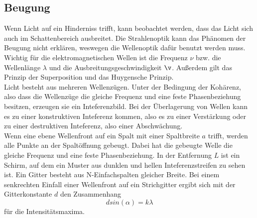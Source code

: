 \subsection{Beugung}
\label{subsec:Beugung}
Wenn Licht auf ein Hinderniss trifft, kann beobachtet werden, dass das Licht sich auch im Schattenbereich ausbreitet.
Die Strahlenoptik kann das Phänomen der Beugung nicht erklären, weswegen die Wellenoptik dafür benutzt werden muss.
Wichtig für die elektromagnetischen Wellen ist die Frequenz $\nu$ bzw. die Wellenlänge $\lambda$ und die Ausbreitungsgeschwindigkeit $\v$.
Außerdem gilt das Prinzip der Superposition und das Huygensche Prinzip.\\
Licht besteht aus mehreren Wellenzügen.
Unter der Bedingung der Kohärenz, also dass die Wellenzüge die gleiche Frequenz und eine feste Phasenbeziehung besitzen, erzeugen sie ein Inteferenzbild.
Bei der Überlagerung von Wellen kann es zu einer konstruktiven Inteferenz kommen, also es zu einer  Verstärkung oder zu einer destruktiven
Inteferenz, also einer Abschwächung.\\
Wenn eine ebene Wellenfront auf ein Spalt mit einer Spaltbreite $a$ trifft, werden alle Punkte an der Spaltöffnung gebeugt.
Dabei hat die gebeugte Welle die gleiche Frequenz und eine feste Phasenbeziehung. 
In der Entfernung $L$ ist ein Schirm, auf dem ein Muster aus dunklen und hellen Inteferenzstreifen zu sehen ist.
Ein Gitter besteht aus N-Einfachspalten gleicher Breite.
Bei einem senkrechten Einfall einer Wellenfront auf ein Strichgitter ergibt sich mit der Gitterkonstante $d$ den Zusammenhang
\begin{equation}
    d sin(\alpha) = k \lambda
    \label{eqn:Gitter}
\end{equation}
für die Intensitätsmaxima.

